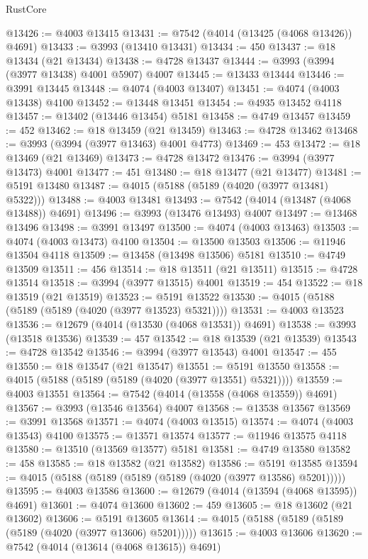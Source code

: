 \begin{lexlean}{RustCore}
\begin{coremodule}
@13426 := @4003 @13415
@13431 := @7542 (@4014 (@13425 (@4068 @13426)) @4691)
@13433 := @3993 (@13410 @13431)
@13434 := 450
@13437 := @18 @13434 (@21 @13434)
@13438 := @4728 @13437
@13444 := @3993 (@3994 (@3977 @13438) @4001 @5907) @4007
@13445 := @13433 @13444
@13446 := @3991 @13445
@13448 := @4074 (@4003 @13407)
@13451 := @4074 (@4003 @13438) @4100
@13452 := @13448 @13451
@13454 := @4935 @13452 @4118
@13457 := @13402 (@13446 @13454) @5181
@13458 := @4749 @13457
@13459 := 452
@13462 := @18 @13459 (@21 @13459)
@13463 := @4728 @13462
@13468 := @3993 (@3994 (@3977 @13463) @4001 @4773)
@13469 := 453
@13472 := @18 @13469 (@21 @13469)
@13473 := @4728 @13472
@13476 := @3994 (@3977 @13473) @4001
@13477 := 451
@13480 := @18 @13477 (@21 @13477)
@13481 := @5191 @13480
@13487 := @4015 (@5188 (@5189 (@4020 (@3977 @13481) @5322)))
@13488 := @4003 @13481
@13493 := @7542 (@4014 (@13487 (@4068 @13488)) @4691)
@13496 := @3993 (@13476 @13493) @4007
@13497 := @13468 @13496
@13498 := @3991 @13497
@13500 := @4074 (@4003 @13463)
@13503 := @4074 (@4003 @13473) @4100
@13504 := @13500 @13503
@13506 := @11946 @13504 @4118
@13509 := @13458 (@13498 @13506) @5181
@13510 := @4749 @13509
@13511 := 456
@13514 := @18 @13511 (@21 @13511)
@13515 := @4728 @13514
@13518 := @3994 (@3977 @13515) @4001
@13519 := 454
@13522 := @18 @13519 (@21 @13519)
@13523 := @5191 @13522
@13530 := @4015 (@5188 (@5189 (@5189 (@4020 (@3977 @13523) @5321))))
@13531 := @4003 @13523
@13536 := @12679 (@4014 (@13530 (@4068 @13531)) @4691)
@13538 := @3993 (@13518 @13536)
@13539 := 457
@13542 := @18 @13539 (@21 @13539)
@13543 := @4728 @13542
@13546 := @3994 (@3977 @13543) @4001
@13547 := 455
@13550 := @18 @13547 (@21 @13547)
@13551 := @5191 @13550
@13558 := @4015 (@5188 (@5189 (@5189 (@4020 (@3977 @13551) @5321))))
@13559 := @4003 @13551
@13564 := @7542 (@4014 (@13558 (@4068 @13559)) @4691)
@13567 := @3993 (@13546 @13564) @4007
@13568 := @13538 @13567
@13569 := @3991 @13568
@13571 := @4074 (@4003 @13515)
@13574 := @4074 (@4003 @13543) @4100
@13575 := @13571 @13574
@13577 := @11946 @13575 @4118
@13580 := @13510 (@13569 @13577) @5181
@13581 := @4749 @13580
@13582 := 458
@13585 := @18 @13582 (@21 @13582)
@13586 := @5191 @13585
@13594 := @4015 (@5188 (@5189 (@5189 (@5189 (@4020 (@3977 @13586) @5201)))))
@13595 := @4003 @13586
@13600 := @12679 (@4014 (@13594 (@4068 @13595)) @4691)
@13601 := @4074 @13600
@13602 := 459
@13605 := @18 @13602 (@21 @13602)
@13606 := @5191 @13605
@13614 := @4015 (@5188 (@5189 (@5189 (@5189 (@4020 (@3977 @13606) @5201)))))
@13615 := @4003 @13606
@13620 := @7542 (@4014 (@13614 (@4068 @13615)) @4691)

\end{coremodule}
\end{lexlean}
